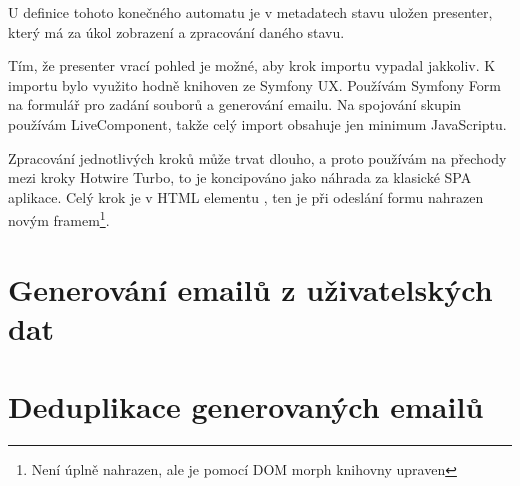 U definice tohoto konečného automatu je v metadatech stavu uložen presenter, který má za úkol zobrazení a zpracování daného stavu.

Tím, že presenter vrací pohled je možné, aby krok importu vypadal jakkoliv.
K importu bylo využito hodně knihoven ze Symfony UX.
Používám Symfony Form na formulář pro zadání souborů a generování emailu.
Na spojování skupin používám LiveComponent, takže celý import obsahuje jen minimum JavaScriptu.

Zpracování jednotlivých kroků může trvat dlouho, a proto používám na přechody mezi kroky Hotwire Turbo, to je koncipováno jako náhrada za klasické SPA aplikace.
Celý krok je v HTML elementu , ten je při odeslání formu nahrazen novým framem\footnote{Není úplně nahrazen, ale je pomocí DOM morph knihovny upraven}. 



\section{Generování emailů z uživatelských dat}

\section{Deduplikace generovaných emailů}

